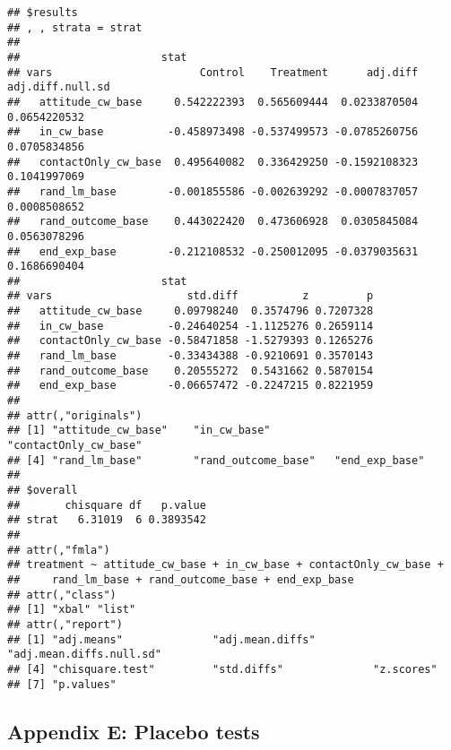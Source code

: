 \documentclass[
]{article}
\begin{document}
\begin{verbatim}
## $results
## , , strata = strat
## 
##                      stat
## vars                       Control    Treatment      adj.diff adj.diff.null.sd
##   attitude_cw_base     0.542222393  0.565609444  0.0233870504     0.0654220532
##   in_cw_base          -0.458973498 -0.537499573 -0.0785260756     0.0705834856
##   contactOnly_cw_base  0.495640082  0.336429250 -0.1592108323     0.1041997069
##   rand_lm_base        -0.001855586 -0.002639292 -0.0007837057     0.0008508652
##   rand_outcome_base    0.443022420  0.473606928  0.0305845084     0.0563078296
##   end_exp_base        -0.212108532 -0.250012095 -0.0379035631     0.1686690404
##                      stat
## vars                     std.diff          z         p
##   attitude_cw_base     0.09798240  0.3574796 0.7207328
##   in_cw_base          -0.24640254 -1.1125276 0.2659114
##   contactOnly_cw_base -0.58471858 -1.5279393 0.1265276
##   rand_lm_base        -0.33434388 -0.9210691 0.3570143
##   rand_outcome_base    0.20555272  0.5431662 0.5870154
##   end_exp_base        -0.06657472 -0.2247215 0.8221959
## 
## attr(,"originals")
## [1] "attitude_cw_base"    "in_cw_base"          "contactOnly_cw_base"
## [4] "rand_lm_base"        "rand_outcome_base"   "end_exp_base"       
## 
## $overall
##       chisquare df   p.value
## strat   6.31019  6 0.3893542
## 
## attr(,"fmla")
## treatment ~ attitude_cw_base + in_cw_base + contactOnly_cw_base + 
##     rand_lm_base + rand_outcome_base + end_exp_base
## attr(,"class")
## [1] "xbal" "list"
## attr(,"report")
## [1] "adj.means"              "adj.mean.diffs"         "adj.mean.diffs.null.sd"
## [4] "chisquare.test"         "std.diffs"              "z.scores"              
## [7] "p.values"
\end{verbatim}

\hypertarget{appendix-e-placebo-tests}{%
\subsection{Appendix E: Placebo tests}\label{appendix-e-placebo-tests}}
\end{document}

